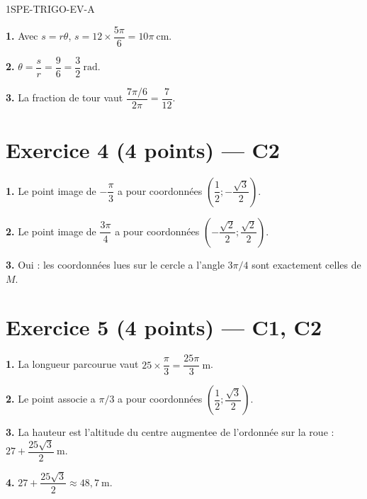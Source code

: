 \begin{corrige}{1SPE-TRIGO-EV-A}

\textbf{1.} Avec $s=r\theta$, $s=12\times\dfrac{5\pi}{6}=\boxed{10\pi\ \text{cm}}$.

\textbf{2.} $\theta=\dfrac{s}{r}=\dfrac{9}{6}=\boxed{\dfrac32\ \text{rad}}$.

\textbf{3.} La fraction de tour vaut $\dfrac{7\pi/6}{2\pi}=\boxed{\dfrac7{12}}$.

\section*{Exercice 4 \hfill (4 points) — C2}


\textbf{1.} Le point image de $-\dfrac{\pi}{3}$ a pour coordonnées $\boxed{\left(\dfrac12;-\dfrac{\sqrt3}{2}\right)}$.

\textbf{2.} Le point image de $\dfrac{3\pi}{4}$ a pour coordonnées $\boxed{\left(-\dfrac{\sqrt2}{2};\dfrac{\sqrt2}{2}\right)}$.

\textbf{3.} Oui : les coordonnées lues sur le cercle a l'angle $3\pi/4$ sont exactement celles de $M$.

\section*{Exercice 5 \hfill (4 points) — C1, C2}


\textbf{1.} La longueur parcourue vaut $25\times\dfrac{\pi}{3}=\boxed{\dfrac{25\pi}{3}\ \text{m}}$.

\textbf{2.} Le point associe a $\pi/3$ a pour coordonnées $\boxed{\left(\dfrac12;\dfrac{\sqrt3}{2}\right)}$.

\textbf{3.} La hauteur est l'altitude du centre augmentee de l'ordonnée sur la roue : $\boxed{27+\dfrac{25\sqrt3}{2}\ \text{m}}$.

\textbf{4.} $27+\dfrac{25\sqrt3}{2}\approx\boxed{48{,}7\ \text{m}}$.

\end{corrige}
